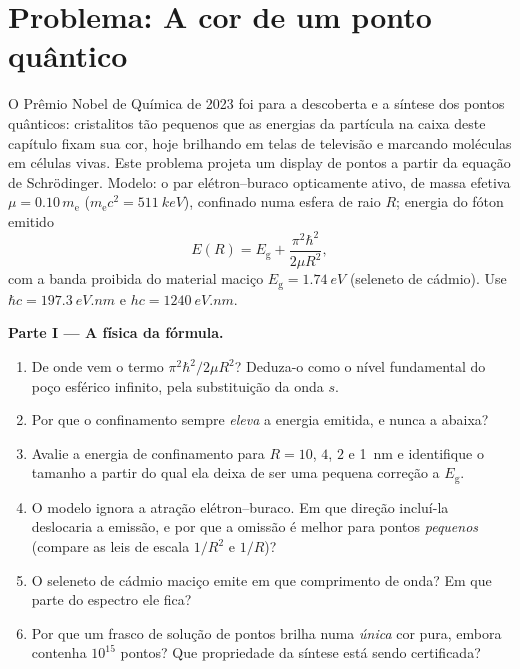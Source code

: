 \section{Problema: A cor de um ponto quântico}

\begin{problem}\label{pb:b3:schrodinger-three-dimensions:1}
O Prêmio Nobel de Química de 2023 foi para a descoberta e a síntese dos
pontos quânticos: cristalitos tão pequenos que as energias da partícula
na caixa deste capítulo fixam sua cor, hoje brilhando em telas de
televisão e marcando moléculas em células vivas. Este problema projeta
um display de pontos a partir da equação de Schrödinger. Modelo: o par
elétron--buraco opticamente ativo, de massa efetiva
$\mu = 0.10\,m_{\text{e}}$ ($m_{\text{e}}c^2 = \qty{511}{keV}$),
confinado numa esfera de raio $R$; energia do fóton emitido
\[
E(R) = E_{\text{g}} + \frac{\pi^2\hbar^2}{2\mu R^2} ,
\]
com a banda proibida do material maciço
$E_{\text{g}} = \qty{1.74}{eV}$ (seleneto de cádmio). Use
$\hbar c = \qty{197.3}{eV.nm}$ e $hc =
\qty{1240}{eV.nm}$.

\medskip\noindent\textbf{Parte I --- A física da fórmula.}
\begin{enumerate}
  \item De onde vem o termo $\pi^2\hbar^2/2\mu R^2$? Deduza-o como o
        nível fundamental do poço esférico infinito, pela substituição
        da onda $s$.
  \item Por que o confinamento sempre \emph{eleva} a energia emitida, e
        nunca a abaixa?
  \item Avalie a energia de confinamento para $R = 10$, $4$, $2$ e
        \qty{1}{nm} e identifique o tamanho a partir do qual ela deixa
        de ser uma pequena correção a $E_{\text{g}}$.
  \item O modelo ignora a atração elétron--buraco. Em que direção
        incluí-la deslocaria a emissão, e por que a omissão é melhor
        para pontos \emph{pequenos} (compare as leis de escala $1/R^2$
        e $1/R$)?
  \item O seleneto de cádmio maciço emite em que comprimento de onda?
        Em que parte do espectro ele fica?
  \item Por que um frasco de solução de pontos brilha numa \emph{única}
        cor pura, embora contenha $10^{15}$ pontos? Que propriedade da
        síntese está sendo certificada?
\end{enumerate}


\end{problem}

